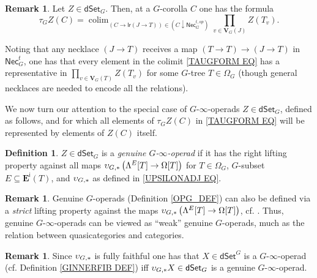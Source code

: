 \documentclass[a4paper,10pt
,draft
]{article}%
\numberwithin{equation}{section}
\numberwithin{figure}{section}
\theoremstyle{definition} %
\newtheorem{definition}[equation]{Definition}%
\newtheorem{remark}[equation]{Remark}%
\DeclareMathOperator{\colim}{colim}%
\newcommand{\1}{\ensuremath{\mathbbm 1}}%
\begin{document}
\begin{remark}
	Let $Z \in \mathsf{dSet}_G$. 
	Then, at a $G$-corolla $C$ one has the formula
\begin{equation}\label{TAUGFORM EQ}
	\tau_G Z(C) = 
	\colim_{(C \to \mathsf{lr}(J \to T))\in(C \downarrow \mathsf{Nec}_G^{t,op})}
	\prod_{v \in \boldsymbol{V}_G(J)} Z(T_v).
\end{equation}
\end{remark}

Noting that any necklace $(J\to T)$ 
receives a map 
$(T \to T) \to (J \to T)$
in $\mathsf{Nec}^t_G$,
one has that every element in the colimit
\eqref{TAUGFORM EQ} has a representative in 
$\prod_{v \in \boldsymbol{V}_G(T)} Z(T_v)$
for some $G$-tree $T\in \Omega_G$
(though general necklaces are needed to encode all the relations).

We now turn our attention to the special case of 
$G$-$\infty$-operads $Z \in \mathsf{dSet}_G$, 
defined as follows,
and for which all elements of
$\tau_G Z(C)$ in \eqref{TAUGFORM EQ}
will be represented by elements of $Z(C)$ itself.

\begin{definition}\label{GENINFOP DEF}
        $Z \in \mathsf{dSet}_G$
        is a \emph{genuine $G$-$\infty$-operad}
        if it has the right lifting property against all maps
        $\upsilon_{G,\**} 
        \left(\Lambda^E[T] \to \Omega[T]\right)$
        for $T \in \Omega_G$,
        $G$-subset
        $E \subseteq \boldsymbol{E}^{\mathsf{i}}(T)$,
        and $\upsilon_{G,\**}$
        as defined in \eqref{UPSILONADJ EQ}.
\end{definition}

\begin{remark}
	Genuine $G$-operads (Definition \ref{OPG_DEF})
	can also be defined via a \emph{strict}
	lifting property against the maps
	$\upsilon_{G,\**} \left(\Lambda^E[T] \to \Omega[T]\right)$,
	cf. \cite[Def. 3.35]{BP_edss}.
	Thus, genuine $G$-$\infty$-operads
	can be viewed as ``weak'' genuine $G$-operads,
	much as the relation between quasicategories
	and categories.
\end{remark}

\begin{remark}
	Since $\upsilon_{G,\**}$
	is fully faithful
	one has that 
	$X \in \mathsf{dSet}^G$
	is a $G$-$\infty$-operad 
	(cf. Definition \ref{GINNERFIB DEF})
	iff
	$\upsilon_{G,\**}X \in \mathsf{dSet}_G$
	is a genuine $G$-$\infty$-operad.
\end{remark}
\end{document}
